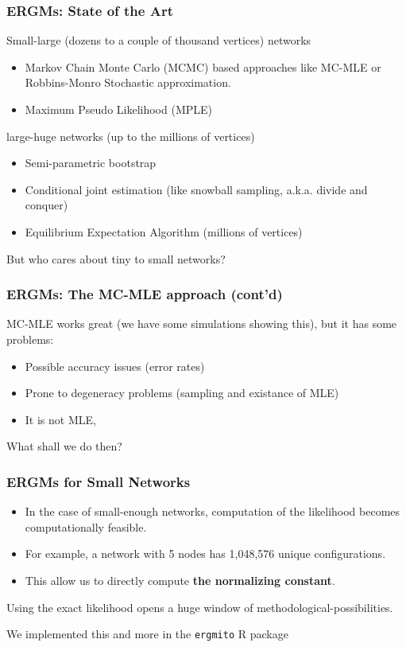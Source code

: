 \documentclass[aspectratio=169, 10pt]{beamer}
\newcommand{\ergmitopkg}[0]{\texttt{ergmito}}
\begin{document}
\begin{frame}[label=art]
\frametitle{ERGMs: State of the Art}
\pause
Small-large (dozens to a couple of thousand vertices) networks

\begin{itemize}
\item Markov Chain Monte Carlo (MCMC) based approaches like MC-MLE or Robbins-Monro Stochastic approximation. \hyperlink{mcmle}{}
\item Maximum Pseudo Likelihood (MPLE)
\end{itemize}\pause

large-huge networks (up to the millions of vertices)

\begin{itemize}
\item Semi-parametric bootstrap
\item Conditional joint estimation (like snowball sampling, a.k.a. divide and conquer)
\item Equilibrium Expectation Algorithm (millions of vertices)
\end{itemize}\pause

But who cares about tiny to small networks?

\end{frame}

\begin{frame}
\frametitle{ERGMs: The MC-MLE approach (cont'd)}

MC-MLE works great (we have some simulations showing this), but it has some
problems:

\begin{itemize}
\item Possible accuracy issues (error rates)
\item Prone to degeneracy problems (sampling and existance of MLE)
\item It is not MLE,
\end{itemize}

What shall we do then?

\end{frame}

\begin{frame}[label=ergmito]
\frametitle{ERGMs for Small Networks}

\begin{itemize}
\item In the case of small-enough networks, computation of the likelihood becomes
computationally feasible.
\item For example, a network with 5 nodes has 1,048,576
unique configurations.
\item This allow us to directly compute {\bf\color{normconst} the normalizing constant}.
\end{itemize}

Using the exact likelihood opens a huge window of methodological-possibilities.

We implemented this and more in the \ergmitopkg{} R package \hyperlink{ergmitopkg}{}
\end{frame}
\end{document}
